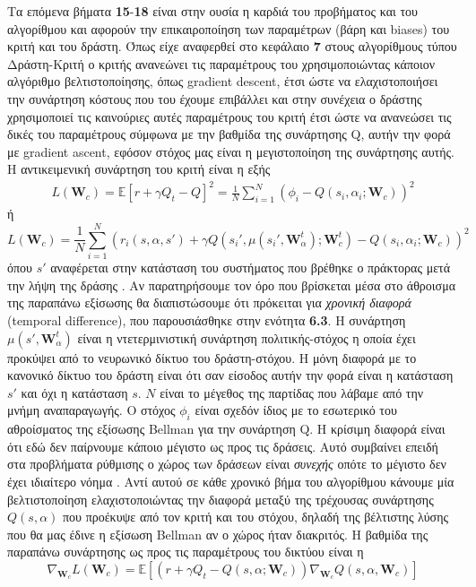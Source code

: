 \documentclass[11pt]{article} %
\numberwithin{equation}{subsection}
\begin{document}
Τα επόμενα βήματα \textbf{15}-\textbf{18} είναι στην ουσία η καρδιά του προβήματος και του αλγορίθμου και αφορούν την επικαιροποίηση των παραμέτρων (βάρη και biases) του κριτή και του δράστη. Όπως είχε αναφερθεί στο κεφάλαιο \textbf{7} στους αλγορίθμους τύπου Δράστη-Κριτή ο κριτής ανανεώνει τις παραμέτρους του χρησιμοποιώντας κάποιον αλγόριθμο βελτιστοποίησης, όπως gradient descent, έτσι ώστε να ελαχιστοποιήσει την συνάρτηση κόστους που του έχουμε επιβάλλει και στην συνέχεια ο δράστης χρησιμοποιεί τις καινούριες αυτές παραμέτρους του κριτή έτσι ώστε να ανανεώσει τις δικές του παραμέτρους σύμφωνα με την βαθμίδα της συνάρτησης Q, αυτήν την φορά με gradient ascent, εφόσον στόχος μας είναι η μεγιστοποίηση της συνάρτησης αυτής. Η αντικειμενική συνάρτηση του κριτή είναι η εξής \cite{deepmind, stupidpaper2}\\
\begin{align*}
\displaystyle L(\textbf{W}_{c}) = \mathbb{E} \left[r + \gamma Q_{t}  - Q \right] ^ {2} =  \frac{1}{N} \sum_{i=1}^{N} \left(\phi_{i} - Q(s_{i}, \alpha_{i}; \textbf{W}_c) \right) ^ {2} 
\end{align*}
ή\\
\begin{equation}
\displaystyle L(\textbf{W}_{c}) = \frac{1}{N} \sum_{i=1}^{N} \left( r_{i}(s, \alpha, s') + \gamma Q(s_{i}', \mu(s_{i}', \textbf{W}_α ^ t); \textbf{W}_c ^ t) - Q(s_{i}, \alpha_{i}; \textbf{W}_{c}) \right) ^ {2}
\end{equation}
όπου $s'$ αναφέρεται στην κατάσταση του συστήματος που βρέθηκε ο πράκτορας μετά την λήψη της δράσης \alpha. Αν παρατηρήσουμε τον όρο που βρίσκεται μέσα στο άθροισμα της παραπάνω εξίσωσης θα διαπιστώσουμε ότι πρόκειται για \textit{χρονική διαφορά} (temporal difference), που παρουσιάσθηκε στην ενότητα \textbf{6.3}. Η συνάρτηση $\mu(s', \textbf{W}_α ^ t)$ είναι η ντετερμινιστική συνάρτηση πολιτικής-στόχος η οποία έχει προκύψει από το νευρωνικό δίκτυο του δράστη-στόχου. Η μόνη διαφορά με το κανονικό δίκτυο του δράστη είναι ότι σαν είσοδος αυτήν την φορά είναι η κατάσταση $s'$ και όχι η κατάσταση $s$. $N$ είναι το μέγεθος της παρτίδας που λάβαμε από την μνήμη αναπαραγωγής. Ο στόχος $\phi_{i}$ είναι σχεδόν ίδιος με το εσωτερικό του αθροίσματος της εξίσωσης Bellman για την συνάρτηση Q. Η κρίσιμη διαφορά είναι ότι εδώ δεν παίρνουμε κάποιο μέγιστο ως προς τις δράσεις. Αυτό συμβαίνει επειδή στα προβλήματα ρύθμισης ο χώρος των δράσεων είναι \textit{συνεχής} οπότε το μέγιστο δεν έχει ιδιαίτερο νόημα \cite{stupidpaper2}. Αντί αυτού σε κάθε χρονικό βήμα του αλγορίθμου κάνουμε μία βελτιστοποίηση ελαχιστοποιώντας την διαφορά μεταξύ της τρέχουσας συνάρτησης $Q(s,\alpha)$ που προέκυψε από τον κριτή και του στόχου, δηλαδή της βέλτιστης λύσης που θα μας έδινε η εξίσωση Bellman αν ο χώρος ήταν διακριτός. Η βαθμίδα της παραπάνω συνάρτησης ως προς τις παραμέτρους του δικτύου είναι η
\begin{equation}
\nabla_{\textbf{W}_c} L(\textbf{W}_{c}) = \mathbb{E} \left[(r + \gamma Q_{t} - Q(s,\alpha; \textbf{W}_c)) \nabla_{\textbf{W}_c} Q(s,\alpha, \textbf{W}_c) \right]
\end{equation}
\end{document}
